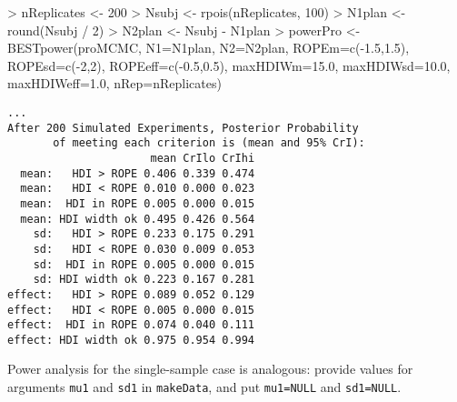 \documentclass[a4paper]{article}
\begin{document}
\begin{Schunk}
\begin{Sinput}
> nReplicates <- 200
> Nsubj <- rpois(nReplicates, 100)
> N1plan <- round(Nsubj / 2)
> N2plan <- Nsubj - N1plan
> powerPro <- BESTpower(proMCMC, N1=N1plan, N2=N2plan,
                 ROPEm=c(-1.5,1.5), ROPEsd=c(-2,2), ROPEeff=c(-0.5,0.5), 
                 maxHDIWm=15.0, maxHDIWsd=10.0, maxHDIWeff=1.0,
                 nRep=nReplicates) 
\end{Sinput}
\end{Schunk}
\begin{verbatim}
...
After 200 Simulated Experiments, Posterior Probability
       of meeting each criterion is (mean and 95% CrI):
                      mean CrIlo CrIhi
  mean:   HDI > ROPE 0.406 0.339 0.474
  mean:   HDI < ROPE 0.010 0.000 0.023
  mean:  HDI in ROPE 0.005 0.000 0.015
  mean: HDI width ok 0.495 0.426 0.564
    sd:   HDI > ROPE 0.233 0.175 0.291
    sd:   HDI < ROPE 0.030 0.009 0.053
    sd:  HDI in ROPE 0.005 0.000 0.015
    sd: HDI width ok 0.223 0.167 0.281
effect:   HDI > ROPE 0.089 0.052 0.129
effect:   HDI < ROPE 0.005 0.000 0.015
effect:  HDI in ROPE 0.074 0.040 0.111
effect: HDI width ok 0.975 0.954 0.994
\end{verbatim}



Power analysis for the single-sample case is analogous: provide values for arguments \texttt{mu1} and \texttt{sd1} in \texttt{makeData}, and put \texttt{mu1=NULL} and \texttt{sd1=NULL}.



\newpage %




\end{document}
